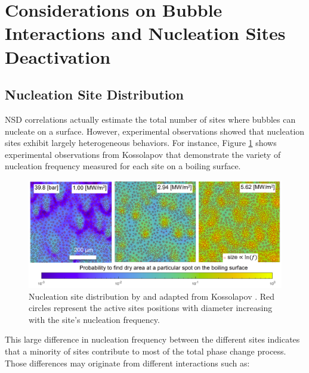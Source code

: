 \section{Considerations on Bubble Interactions and Nucleation Sites Deactivation}
\label{sec:site_interactions}

\subsection{Nucleation Site Distribution}

NSD correlations actually estimate the total number of sites where bubbles can nucleate on a surface. However, experimental observations showed that nucleation sites exhibit largely heterogeneous behaviors. For instance, Figure \ref{fig:sites_f_koss} shows experimental observations from Kossolapov \cite{kossolapov_experimental_2021} that demonstrate the variety of nucleation frequency measured for each site on a boiling surface.

\begin{figure}[!h]
\centering
\includegraphics[width=0.9\linewidth]{img/site_interaction/site_f_kossolapov.PNG}
\caption{Nucleation site distribution by and adapted from Kossolapov \cite{kossolapov_experimental_2021}. Red circles represent the active sites positions with diameter increasing with the site's nucleation frequency.}
\label{fig:sites_f_koss}
\end{figure}

\npar

This large difference in nucleation frequency between the different sites indicates that a minority of sites contribute to most of the total phase change process. Those differences may originate from different interactions such as:


